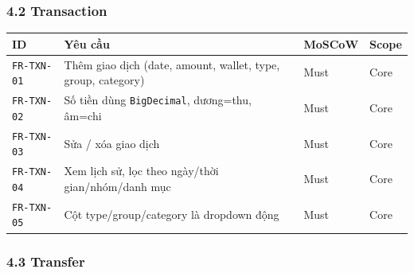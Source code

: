 \documentclass[11pt,a4paper]{article}
\newcounter{none}
\newcommand{\faintline}{%
  \noalign{\global\arrayrulecolor{faintgray}}%
  \hline
  \noalign{\global\arrayrulecolor{black}}%
} %
\begin{document}
\subsubsection{4.2 Transaction}\label{transaction}

{\def\LTcaptype{none}
\begin{longtable}[]{@{}
  >{\raggedright\arraybackslash}p{}
  >{\raggedright\arraybackslash}p{}
  >{\centering\arraybackslash}p{}
  >{\centering\arraybackslash}p{}@{}}
\toprule\noalign{}
\begin{minipage}[b]{\linewidth}\raggedright
ID
\end{minipage} & \begin{minipage}[b]{\linewidth}\raggedright
Yêu cầu
\end{minipage} & \begin{minipage}[b]{\linewidth}\raggedright
MoSCoW
\end{minipage} & \begin{minipage}[b]{\linewidth}\raggedright
Scope
\end{minipage} \\
\midrule\noalign{}
\endhead
\bottomrule\noalign{}
\endlastfoot
\texttt{FR-TXN-01} & Thêm giao dịch (date, amount, wallet, type, group, category) & Must & Core \\ \faintline
\texttt{FR-TXN-02} & Số tiền dùng \texttt{BigDecimal}, dương=thu, âm=chi & Must & Core \\ \faintline
\texttt{FR-TXN-03} & Sửa / xóa giao dịch & Must & Core \\ \faintline
\texttt{FR-TXN-04} & Xem lịch sử, lọc theo ngày/thời gian/nhóm/danh mục & Must & Core \\ \faintline
\texttt{FR-TXN-05} & Cột type/group/category là dropdown động & Must & Core \\
\end{longtable}
}

\subsubsection{4.3 Transfer}\label{transfer}
\end{document}
